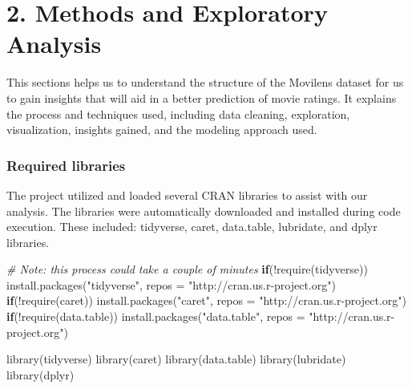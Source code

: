 \documentclass[
]{article}
\newenvironment{Shaded}{\begin{snugshade}}{\end{snugshade}}
\newcommand{\AttributeTok}[1]{\textcolor[rgb]{0.77,0.63,0.00}{#1}}
\newcommand{\CommentTok}[1]{\textcolor[rgb]{0.56,0.35,0.01}{\textit{#1}}}
\newcommand{\ControlFlowTok}[1]{\textcolor[rgb]{0.13,0.29,0.53}{\textbf{#1}}}
\newcommand{\FunctionTok}[1]{\textcolor[rgb]{0.00,0.00,0.00}{#1}}
\newcommand{\NormalTok}[1]{#1}
\newcommand{\SpecialCharTok}[1]{\textcolor[rgb]{0.00,0.00,0.00}{#1}}
\newcommand{\StringTok}[1]{\textcolor[rgb]{0.31,0.60,0.02}{#1}}
\begin{document}
\hypertarget{methods-and-exploratory-analysis}{%
\section{2. Methods and Exploratory
Analysis}\label{methods-and-exploratory-analysis}}

This sections helps us to understand the structure of the Movilens
dataset for us to gain insights that will aid in a better prediction of
movie ratings. It explains the process and techniques used, including
data cleaning, exploration, visualization, insights gained, and the
modeling approach used.

\hypertarget{required-libraries}{%
\subsubsection{Required libraries}\label{required-libraries}}

The project utilized and loaded several CRAN libraries to assist with
our analysis. The libraries were automatically downloaded and installed
during code execution. These included: tidyverse, caret, data.table,
lubridate, and dplyr libraries.

\begin{Shaded}
\begin{Highlighting}[]
\CommentTok{\# Note: this process could take a couple of minutes}
\ControlFlowTok{if}\NormalTok{(}\SpecialCharTok{!}\FunctionTok{require}\NormalTok{(tidyverse)) }\FunctionTok{install.packages}\NormalTok{(}\StringTok{"tidyverse"}\NormalTok{, }\AttributeTok{repos =} \StringTok{"http://cran.us.r{-}project.org"}\NormalTok{)}
\ControlFlowTok{if}\NormalTok{(}\SpecialCharTok{!}\FunctionTok{require}\NormalTok{(caret)) }\FunctionTok{install.packages}\NormalTok{(}\StringTok{"caret"}\NormalTok{, }\AttributeTok{repos =} \StringTok{"http://cran.us.r{-}project.org"}\NormalTok{)}
\ControlFlowTok{if}\NormalTok{(}\SpecialCharTok{!}\FunctionTok{require}\NormalTok{(data.table)) }\FunctionTok{install.packages}\NormalTok{(}\StringTok{"data.table"}\NormalTok{, }\AttributeTok{repos =} \StringTok{"http://cran.us.r{-}project.org"}\NormalTok{)}

\FunctionTok{library}\NormalTok{(tidyverse)}
\FunctionTok{library}\NormalTok{(caret)}
\FunctionTok{library}\NormalTok{(data.table)}
\FunctionTok{library}\NormalTok{(lubridate)}
\FunctionTok{library}\NormalTok{(dplyr)}
\end{Highlighting}
\end{Shaded}
\end{document}
